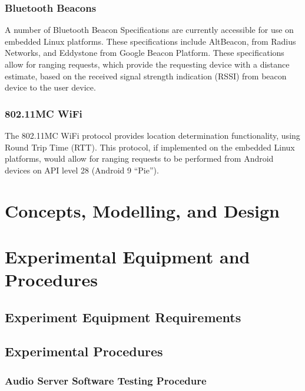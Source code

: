 \documentclass[11pt,a4paper]{scrreprt}
\begin{document}
\subsection{Bluetooth Beacons}\label{bluetooth-beacons}

A number of Bluetooth Beacon Specifications are currently accessible for
use on embedded Linux platforms. These specifications include
AltBeacon\cite{altbeacon}, from Radius Networks, and
Eddystone\cite{eddystone} from Google Beacon Platform. These
specifications allow for ranging requests, which provide the requesting
device with a distance estimate, based on the received signal strength
indication (RSSI) from beacon device to the user device.

\subsection{802.11MC WiFi}\label{mc-wifi}

The 802.11MC WiFi protocol provides location determination
functionality, using Round Trip Time (RTT). This protocol, if
implemented on the embedded Linux platforms, would allow for ranging
requests to be performed from Android devices on API level 28 (Android 9
``Pie'')\cite{droidRTT}.

\chapter{Concepts, Modelling, and
Design}\label{concepts-modelling-and-design}

\chapter{Experimental Equipment and
Procedures}\label{experimental-equipment-and-procedures}

\section{Experiment Equipment
Requirements}\label{experiment-equipment-requirements}

\section{Experimental Procedures}\label{experimental-procedures}

\subsection{Audio Server Software Testing
Procedure}\label{audio-server-software-testing-procedure}
\end{document}
